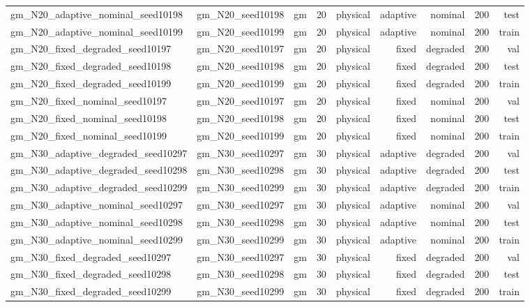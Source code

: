 \begin{tabular}{lrrrrrrrr}
gm\_N20\_adaptive\_nominal\_seed10198 & gm\_N20\_seed10198 & gm & 20 & physical & adaptive & nominal & 200 & test \\
gm\_N20\_adaptive\_nominal\_seed10199 & gm\_N20\_seed10199 & gm & 20 & physical & adaptive & nominal & 200 & train \\
gm\_N20\_fixed\_degraded\_seed10197 & gm\_N20\_seed10197 & gm & 20 & physical & fixed & degraded & 200 & val \\
gm\_N20\_fixed\_degraded\_seed10198 & gm\_N20\_seed10198 & gm & 20 & physical & fixed & degraded & 200 & test \\
gm\_N20\_fixed\_degraded\_seed10199 & gm\_N20\_seed10199 & gm & 20 & physical & fixed & degraded & 200 & train \\
gm\_N20\_fixed\_nominal\_seed10197 & gm\_N20\_seed10197 & gm & 20 & physical & fixed & nominal & 200 & val \\
gm\_N20\_fixed\_nominal\_seed10198 & gm\_N20\_seed10198 & gm & 20 & physical & fixed & nominal & 200 & test \\
gm\_N20\_fixed\_nominal\_seed10199 & gm\_N20\_seed10199 & gm & 20 & physical & fixed & nominal & 200 & train \\
gm\_N30\_adaptive\_degraded\_seed10297 & gm\_N30\_seed10297 & gm & 30 & physical & adaptive & degraded & 200 & val \\
gm\_N30\_adaptive\_degraded\_seed10298 & gm\_N30\_seed10298 & gm & 30 & physical & adaptive & degraded & 200 & test \\
gm\_N30\_adaptive\_degraded\_seed10299 & gm\_N30\_seed10299 & gm & 30 & physical & adaptive & degraded & 200 & train \\
gm\_N30\_adaptive\_nominal\_seed10297 & gm\_N30\_seed10297 & gm & 30 & physical & adaptive & nominal & 200 & val \\
gm\_N30\_adaptive\_nominal\_seed10298 & gm\_N30\_seed10298 & gm & 30 & physical & adaptive & nominal & 200 & test \\
gm\_N30\_adaptive\_nominal\_seed10299 & gm\_N30\_seed10299 & gm & 30 & physical & adaptive & nominal & 200 & train \\
gm\_N30\_fixed\_degraded\_seed10297 & gm\_N30\_seed10297 & gm & 30 & physical & fixed & degraded & 200 & val \\
gm\_N30\_fixed\_degraded\_seed10298 & gm\_N30\_seed10298 & gm & 30 & physical & fixed & degraded & 200 & test \\
gm\_N30\_fixed\_degraded\_seed10299 & gm\_N30\_seed10299 & gm & 30 & physical & fixed & degraded & 200 & train \\

\end{tabular}
